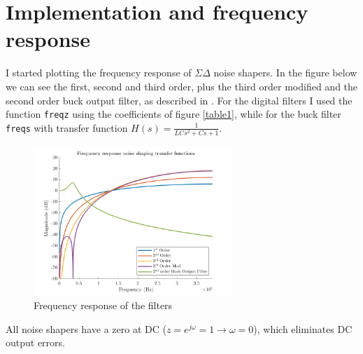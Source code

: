 \documentclass[11pt,a4paper]{article}
\begin{document}
\section{Implementation and frequency response}
I started plotting the frequency response of $\Sigma\Delta$ noise shapers. In the figure below we can see the first, second and third order, plus the third order modified and the second order buck output filter, as described in \cite{norris2008quantization}. 
For the digital filters I used the function \texttt{freqz} using the coefficients of figure \ref{table1}, while for the buck filter \texttt{freqs} with transfer function $H(s)=\frac{1}{LCs^2+Cs+1}$. 
\begin{figure}[H]
	\centering
	\includegraphics[width=75mm]{images/freqresp.png}
	\caption{Frequency response of the filters}
	\label{noise}
\end{figure}
All noise shapers have a zero at DC ($z=e^{j\omega}=1\rightarrow \omega=0$),  which eliminates DC output errors.

\end{document}
